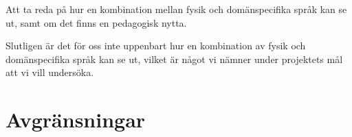 \begin{draft}
Att ta reda på hur en kombination mellan fysik och domänspecifika språk kan se ut, samt om det finns en pedagogisk nytta.   %

Slutligen är det för oss inte uppenbart hur en kombination av fysik och domänspecifika språk kan se ut,
vilket är något vi nämner under projektets mål att vi vill undersöka.


\end{draft}


\section{Avgränsningar}


